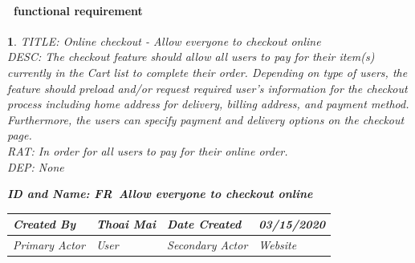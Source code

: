 \documentclass{scrreprt}
\theoremstyle{funreq}
\newtheorem{funreq}{}
\begin{document}
	\paragraph[]{\Subsectionname ~functional requirement }
	\begin{funreq}
		\label{online_checkout}
		TITLE: Online checkout - Allow everyone to checkout online\\
		DESC: The checkout feature should allow all users to pay for their item(s) currently in the Cart list to complete their order. Depending on type of users, the feature should preload and/or request required user’s information for the checkout process including home address for delivery, billing address, and payment method. Furthermore, the users can specify payment and delivery options on the checkout page.\\
		RAT: In order for all users to pay for their online order.\\
		DEP: None\\
		
		\begin{table}[H]
			\begin{flushleft}\bfseries{ID and Name: FR\thefunreq ~\hspace{.6cm}Allow everyone to checkout online}\end{flushleft}
			\begin{tabularx}{\columnwidth}{|X|X|X|X|}
				\hline
				Created By    & Thoai Mai & Date Created    & 03/15/2020 \\ \hline
				Primary Actor & User        & Secondary Actor & Website \\ \hline
			\end{tabularx}
		
\end{table}
\end{funreq}
\end{document}

